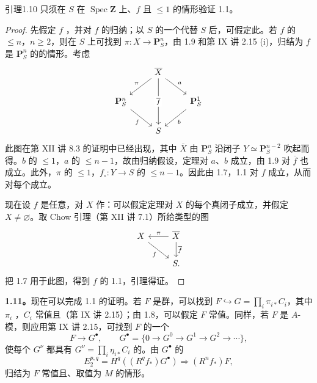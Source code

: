 \begin{SGAresult}{引理}{1.10}
只须在 $S$ 在 $\operatorname{Spec}\mathbf Z$ 上、$f$ 且 $\leq1$ 的情形验证 1.1。
\end{SGAresult}
\begin{proof}
先假定 $f$ ，并对 $f$ 的归纳；以 $S$ 的一个代替 $S$ 后，可假定此。若 $f$ 的 $\leq n$，$n\geq2$，则在 $S$ 上可找到 $\pi:X\to\mathbf P_S^n$，由 1.9 和第 IX 讲 2.15 (i)，归结为 $f$ 是 $\mathbf P_S^n$ 的的情形。考虑
\[
\begin{tikzcd}
&\overline X\arrow[dl,"\pi"']\arrow[dr,"a"]\arrow[dd,"\overline f" description]&\\
\mathbf P_S^n\arrow[dr,"f"']&&\mathbf P_S^1\arrow[dl,"b"]\\
&S&
\end{tikzcd}
\]
此图在第 XII 讲 8.3 的证明中已经出现，其中 $\overline X$ 由 $\mathbf P_S^n$ 沿闭子 $Y\simeq\mathbf P_S^{n-2}$ 吹起而得。$b$ 的 $\leq1$，$a$ 的 $\leq n-1$，故由归纳假设，定理对 $a$、$b$ 成立，由 1.9 对 $\overline f$ 也成立。此外，$\pi$ 的 $\leq1$，$f_\circ:Y\to S$ 的 $\leq n-1$。因此由 1.7，1.1 对 $f$ 成立，从而对每个成立。

现在设 $f$ 是任意，对 $X$ 作：可以假定定理对 $X$ 的每个真闭子成立，并假定 $X\ne\varnothing$。取 Chow 引理（第 XII 讲 7.1）所给类型的图
\[
\begin{tikzcd}
X\arrow[dr,"f"']&\overline X\arrow[l,"\pi"']\arrow[d,"\overline f"]\\
&S.
\end{tikzcd}
\]
把 1.7 用于此图，得到 $f$ 的 1.1，引理得证。
\end{proof}
\textbf{1.11。}现在可以完成 1.1 的证明。若 $F$ 是群，可以找到 $F\hookrightarrow G=\prod_i\pi_{i*}C_i$，其中 $\pi_i$ ，$C_i$ 常值且（第 IX 讲 2.15）；由 1.8，可以假定 $F$ 常值。同样，若 $F$ 是 $A$-模，则应用第 IX 讲 2.15，可找到 $F$ 的一个
\[
F\longrightarrow G^\bullet,\qquad G^\bullet=\{0\longrightarrow G^0\longrightarrow G^1\longrightarrow G^2\longrightarrow\cdots\},
\]
使每个 $G^\nu$ 都具有 $G^\nu=\prod_i\eta_{i*}C_i$ 的。由 $G^\bullet$ 的
\[
E_2^{p,q}=H^q((R^qf_*)G^\bullet)\Longrightarrow(R^nf_*)F,
\]
归结为 $F$ 常值且、取值为 $M$ 的情形。

